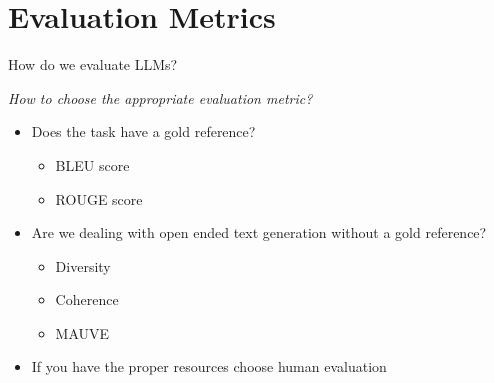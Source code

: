 

\section{Evaluation Metrics}

\begin{vbframe}{How do we evaluate LLM\MakeLowercase{s}?}

\vfill

\textit{How to choose the appropriate evaluation metric?}

\begin{itemize}
    \item Does the task have a gold reference?
    \begin{itemize}
        \item BLEU score 
        \item ROUGE score 
    \end{itemize}
    \item Are we dealing with open ended text generation without a gold reference?
    \begin{itemize}
        \item Diversity 
        \item Coherence 
        \item MAUVE 
    \end{itemize}
    \item If you have the proper resources choose human evaluation
\end{itemize}

\vfill
    
\end{vbframe}




